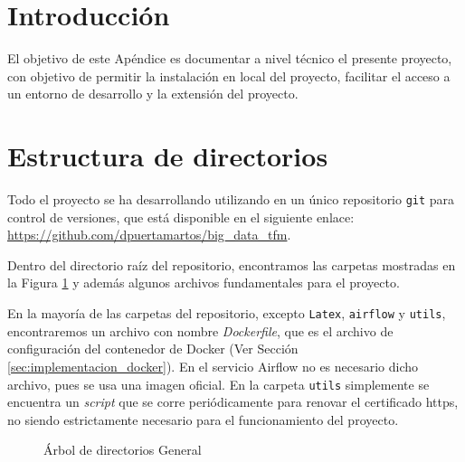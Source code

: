 
\section{Introducción}

El objetivo de este Apéndice es documentar a nivel técnico el presente proyecto, con objetivo de permitir la instalación en local del proyecto, facilitar el acceso a  un entorno de desarrollo y la extensión del proyecto.

\section{Estructura de directorios}

Todo el proyecto se ha desarrollando utilizando en un único repositorio \texttt{git} para control de versiones, que está disponible en el siguiente enlace: \url{https://github.com/dpuertamartos/big_data_tfm}.

Dentro del directorio raíz del repositorio, encontramos las carpetas mostradas en la Figura \ref{fig:dirtree_general} y además algunos archivos fundamentales para el proyecto. 

En la mayoría de las carpetas del repositorio, excepto \texttt{Latex}, \texttt{airflow} y \texttt{utils}, encontraremos un archivo con nombre \textit{Dockerfile}, que es el archivo de configuración del contenedor de Docker (Ver Sección \ref{sec:implementacion_docker}). En el servicio Airflow no es necesario dicho archivo, pues se usa una imagen oficial. En la carpeta \texttt{utils} simplemente se encuentra un \textit{script} que se corre periódicamente para renovar el certificado https, no siendo estrictamente necesario para el funcionamiento del proyecto.


\begin{figure}
	\caption{Árbol de directorios General}
	\label{fig:dirtree_general}
\end{figure}

